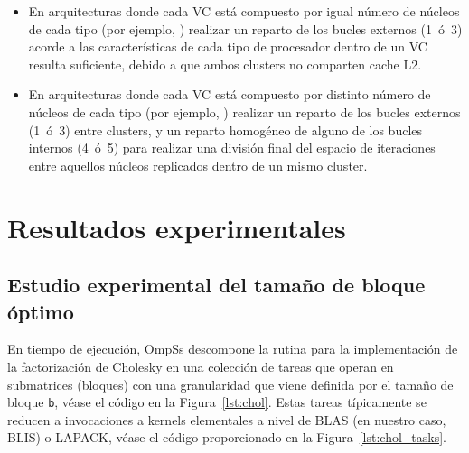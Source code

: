 \begin{itemize}
	\item En arquitecturas donde cada VC está compuesto por igual número de núcleos de cada tipo (por ejemplo, \odroid) realizar un reparto
		de los bucles externos (1~ó~3) acorde a las características de cada tipo de procesador dentro de un VC resulta suficiente, debido
		a que ambos clusters no comparten cache L2.

	\item En arquitecturas donde cada VC está compuesto por distinto número de núcleos de cada tipo (por ejemplo, \juno) realizar
		un reparto de los bucles externos (1~ó~3) entre clusters, y un reparto homogéneo de alguno de los bucles internos (4~ó~5) para realizar
		una división final del espacio de iteraciones entre aquellos núcleos replicados dentro de un mismo cluster.

\end{itemize}




\section{Resultados experimentales}

\subsection{Estudio experimental del tamaño de bloque óptimo}

En tiempo de ejecución, OmpSs descompone la rutina para la implementación de la factorización de Cholesky en una colección de tareas
que operan en submatrices (bloques) con una granularidad que viene definida por el tamaño de bloque {\tt b}, véase el código en la 
Figura~\ref{lst:chol}. Estas tareas típicamente se reducen a invocaciones a kernels elementales a nivel de BLAS (en nuestro caso,
BLIS) o LAPACK, véase el código proporcionado en la Figura~\ref{lst:chol_tasks}.  

